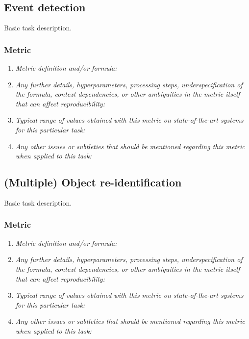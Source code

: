 \documentclass[a4paper,11pt]{article}
\begin{document}
\subsection{Event detection} \label{event_detection}
    Basic task description.
    \subsubsection{Metric}
        \begin{enumerate}[label=\alph*.]
            \item \textit{Metric definition and/or formula:}
            \bigskip
            \item \textit{Any further details, hyperparameters, processing steps, underspecification of the formula, context dependencies, or other ambiguities in the metric itself that can affect reproducibility:}
            \bigskip
            \item \textit{Typical range of values obtained with this metric on state-of-the-art systems for this particular task:}
            \bigskip
            \item \textit{Any other issues or subtleties that should be mentioned regarding this metric when applied to this task:}
            \bigskip
        \end{enumerate}

\subsection{(Multiple) Object re-identification}
    Basic task description.
    \subsubsection{Metric}
        \begin{enumerate}[label=\alph*.]
            \item \textit{Metric definition and/or formula:}
            \bigskip
            \item \textit{Any further details, hyperparameters, processing steps, underspecification of the formula, context dependencies, or other ambiguities in the metric itself that can affect reproducibility:}
            \bigskip
            \item \textit{Typical range of values obtained with this metric on state-of-the-art systems for this particular task:}
            \bigskip
            \item \textit{Any other issues or subtleties that should be mentioned regarding this metric when applied to this task:}
            \bigskip
        \end{enumerate}
\end{document}

